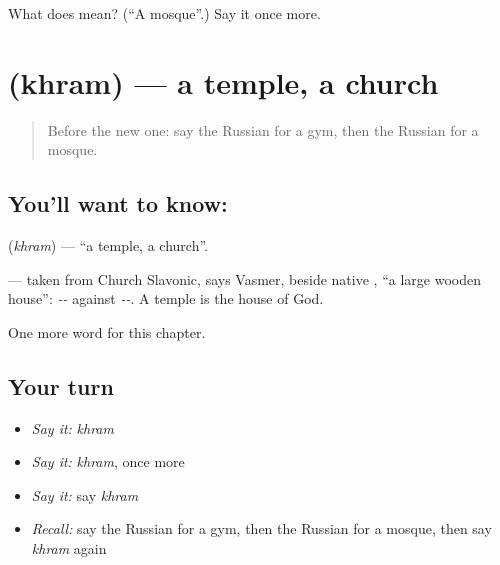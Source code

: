\begin{tcolorbox}[breakable,colback=teal!4,colframe=teal!35!black,title={Before you move on}]
What does  mean? (\textquotedblleft{}A mosque\textquotedblright{}.) Say it once more.
\end{tcolorbox}
\section[\texorpdfstring{\ru{храм} (khram)}{храм (khram)}]{ (khram) — a temple, a church}

\label{lesson:RU-C153-khram}



\begin{quote}
Before the new one: say the Russian for a gym, then the Russian for a mosque.
\end{quote}

\subsection*{You'll want to know: }
\textbf{} (\emph{khram}) — \textquotedblleft{}a temple, a church\textquotedblright{}.

\begin{cousinweb}
\textbf{} — taken from Church Slavonic, says Vasmer, beside native \emph{}, \textquotedblleft{}a large wooden house\textquotedblright{}: \emph{--} against \emph{--}. A temple is the house of God.
\end{cousinweb}

\begin{grammarlens}[title={What you've built}]
One more word for this chapter.
\end{grammarlens}

\subsection*{Your turn}
\begin{itemize}
\raggedright
  \item \emph{Say it:} \emph{khram}
  \item \emph{Say it:} \emph{khram}, once more
  \item \emph{Say it:} say \emph{khram}
  \item \emph{Recall:} say the Russian for a gym, then the Russian for a mosque, then say \emph{khram} again
\end{itemize}

